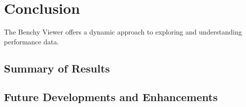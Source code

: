 
\chapter{Conclusion}\label{chapter:conclusion}

The Benchy Viewer offers a dynamic approach to exploring and understanding performance data.

\section{Summary of Results}
\section{Future Developments and Enhancements}
